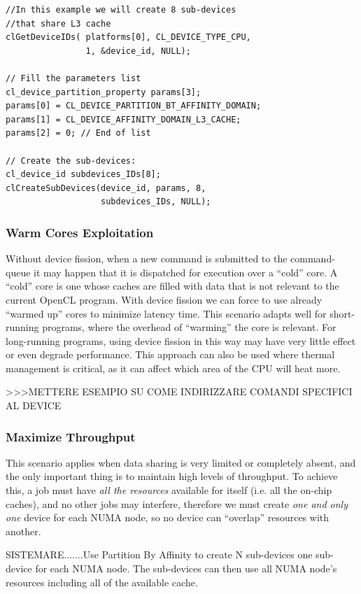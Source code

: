 {\footnotesize\begin{verbatim}
//In this example we will create 8 sub-devices
//that share L3 cache
clGetDeviceIDs( platforms[0], CL_DEVICE_TYPE_CPU,
                1, &device_id, NULL);

// Fill the parameters list
cl_device_partition_property params[3];
params[0] = CL_DEVICE_PARTITION_BT_AFFINITY_DOMAIN;
params[1] = CL_DEVICE_AFFINITY_DOMAIN_L3_CACHE; 
params[2] = 0; // End of list

// Create the sub-devices:
cl_device_id subdevices_IDs[8];
clCreateSubDevices(device_id, params, 8,
                   subdevices_IDs, NULL);
\end{verbatim}}

\subsubsection{Warm Cores Exploitation}
Without device fission, when a new command is submitted to the command-queue it may happen that it is dispatched for execution over a "`cold"' core. A "`cold"' core is one whose caches are filled with data that is not relevant to the current OpenCL program. With device fission we can force to use already "`warmed up"' cores to minimize latency time.
This scenario adapts well for short-running programs, where the overhead of "`warming"' the core is relevant. For long-running programs, using device fission in this way may have very little effect or even degrade performance.
This approach can also be used where thermal management is critical, as it can affect which area of the CPU will heat more.

>>>METTERE ESEMPIO SU COME INDIRIZZARE COMANDI SPECIFICI AL DEVICE

\subsubsection{Maximize Throughput}
This scenario applies when data sharing is very limited or completely absent, and the only important thing is to maintain high levels of throughput. To achieve this, a job must have \textit{all the resources} available for itself (i.e. all the on-chip caches), and no other jobs may interfere, therefore we must create \emph{one and only one} device for each NUMA node, so no device can "`overlap"' resources with another.

SISTEMARE.......Use Partition By Affinity to create N sub-devices one sub-device for each NUMA node.
The sub-devices can then use all NUMA node's resources including all of the available cache.






